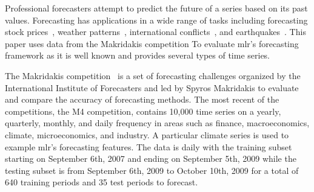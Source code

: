 \documentclass[12pt]{article}\usepackage[]{graphicx}\usepackage[]{color}
\theoremstyle{definition}
\newcommand{\pkg}[1]{{\fontseries{b}\selectfont #1}}
\begin{document}
Professional forecasters attempt to predict the future of a series based on its past values. Forecasting has applications in a wide range of tasks including forecasting stock prices~\cite{GRANGER19923}, weather patterns~\cite{MurphymeteoForecast}, international conflicts~\cite{Chadefaux01012014}, and earthquakes~\cite{earthquakeYegu}. This paper uses data from the Makridakis competition To evaluate \pkg{mlr}'s forecasting framework as it is well known and provides several types of time series.

The Makridakis competition~\cite{Makridakis2000451} is a set of forecasting challenges organized by the International Institute of Forecasters and led by Spyros Makridakis to evaluate and compare the accuracy of forecasting methods. The most recent of the competitions, the M4 competition, contains 10,000 time series on a yearly, quarterly, monthly, and daily frequency in areas such as finance, macroeconomics, climate, microeconomics, and industry. A particular climate series is used to example \pkg{mlr}'s forecasting features. The data is daily with the training subset starting on September 6th, 2007 and ending on September 5th, 2009 while the testing subset is from September 6th, 2009 to October 10th, 2009 for a total of 640 training periods and 35 test periods to forecast.

\singlespacing
\end{document}
